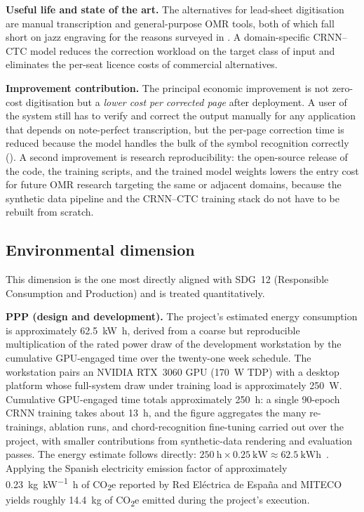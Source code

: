 \textbf{Useful life and state of the art.}
The alternatives for lead-sheet digitisation are manual transcription
and general-purpose OMR tools, both of which fall short on jazz
engraving for the reasons surveyed in .
A domain-specific CRNN--CTC model reduces the correction workload on
the target class of input and eliminates the per-seat licence costs of
commercial alternatives.

\textbf{Improvement contribution.}
The principal economic improvement is not zero-cost digitisation
but a \textit{lower cost per corrected page} after deployment.
A user of the system still has to verify and correct the output
manually for any application that depends on note-perfect
transcription, but the per-page correction time is reduced
because the model handles the bulk of the symbol recognition
correctly ().
A second improvement is research reproducibility: the open-source
release of the code, the training scripts, and the trained model
weights lowers the entry cost for future OMR research targeting
the same or adjacent domains, because the synthetic data pipeline
and the CRNN--CTC training stack do not have to be rebuilt from
scratch.

\subsection{Environmental dimension}
\label{sec:sust-environmental}
This dimension is the one most directly aligned with SDG~12
(Responsible Consumption and Production) and is treated quantitatively.

\textbf{PPP (design and development).}
The project's estimated energy consumption is approximately
\SI{62.5}{\kilo\watt\hour}, derived from a coarse but reproducible
multiplication of the rated power draw of the development
workstation by the cumulative GPU-engaged time over the twenty-one
week schedule.
The workstation pairs an NVIDIA RTX~3060 GPU (\SI{170}{\watt} TDP)
with a desktop platform whose full-system draw under training load
is approximately \SI{250}{\watt}.
Cumulative GPU-engaged time totals approximately
\SI{250}{\hour}: a single 90-epoch CRNN training takes about
\SI{13}{\hour}, and the figure aggregates the many re-trainings,
ablation runs, and chord-recognition fine-tuning carried out over the project,
with smaller contributions from synthetic-data rendering and
evaluation passes.
The energy estimate follows directly:
$\SI{250}{\hour} \times \SI{0.25}{\kilo\watt} \approx
\SI{62.5}{\kilo\watt\hour}$~\cite{strubellEnergyPolicyConsiderations2019,pattersonCarbonConsiderationsDeep2021,lacosteQuantifyingCarbonEmissions2019}.
Applying the Spanish electricity emission factor of approximately
\SI{0.23}{\kilo\gram\per\kilo\watt\hour} of CO\textsubscript{2}e
reported by Red El\'ectrica de Espa\~na and
MITECO~\cite{reeInformeSistemaElectrico2024,mitecoFactorEmision2025}
yields roughly \SI{14.4}{\kilo\gram} of CO\textsubscript{2}e
emitted during the project's execution.

